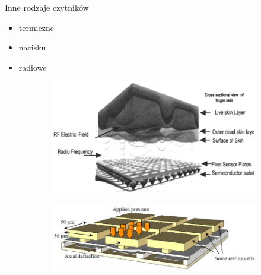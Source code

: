 \documentclass{beamer}
\begin{document}
\begin{frame}{Inne rodzaje czytników}
    \begin{itemize}
        \item termiczne
        \item nacisku
        \item radiowe
    \end{itemize}
    \bigskip
    \begin{figure}
        \centering
        \begin{subfigure}{.49\textwidth}
            \centering
            \includegraphics[width=0.9\linewidth]{types/Radio-Frequency-RF-based-Fingerprint-Sensor-14.png}
        \end{subfigure}
        \begin{subfigure}{.49\textwidth}
            \centering
            \includegraphics[width=0.9\linewidth]{types/IMEN_MEMScapacitive.jpg}
        \end{subfigure}
    \end{figure}
\end{frame}
\end{document}
